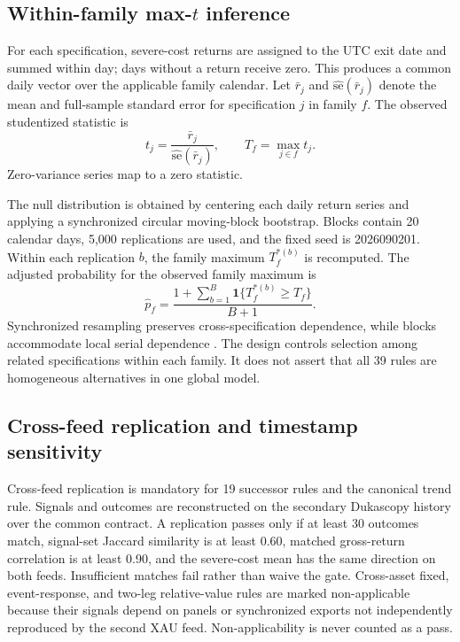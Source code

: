 \subsection{Within-family max-$t$ inference}\label{subsec:maxt}

For each specification, severe-cost returns are assigned to the UTC exit date and summed within day; days without a return receive zero. This produces a common daily vector over the applicable family calendar. Let $\bar r_j$ and $\widehat{\mathrm{se}}(\bar r_j)$ denote the mean and full-sample standard error for specification $j$ in family $f$. The observed studentized statistic is
\begin{equation}
 t_j=\frac{\bar r_j}{\widehat{\mathrm{se}}(\bar r_j)},\qquad
 T_f=\max_{j\in f}t_j.
\end{equation}
Zero-variance series map to a zero statistic.

The null distribution is obtained by centering each daily return series and applying a synchronized circular moving-block bootstrap. Blocks contain 20 calendar days, 5,000 replications are used, and the fixed seed is 2026090201. Within each replication $b$, the family maximum $T_f^{*(b)}$ is recomputed. The adjusted probability for the observed family maximum is
\begin{equation}
 \widehat p_f=\frac{1+\sum_{b=1}^{B}\mathbf{1}\{T_f^{*(b)}\ge T_f\}}{B+1}.
\end{equation}
Synchronized resampling preserves cross-specification dependence, while blocks accommodate local serial dependence \citep{politis1994,romano2005}. The design controls selection among related specifications within each family. It does not assert that all 39 rules are homogeneous alternatives in one global model.

\subsection{Cross-feed replication and timestamp sensitivity}\label{subsec:replication_methods}

Cross-feed replication is mandatory for 19 successor rules and the canonical trend rule. Signals and outcomes are reconstructed on the secondary Dukascopy history over the common contract. A replication passes only if at least 30 outcomes match, signal-set Jaccard similarity is at least 0.60, matched gross-return correlation is at least 0.90, and the severe-cost mean has the same direction on both feeds. Insufficient matches fail rather than waive the gate. Cross-asset fixed, event-response, and two-leg relative-value rules are marked non-applicable because their signals depend on panels or synchronized exports not independently reproduced by the second XAU feed. Non-applicability is never counted as a pass.

